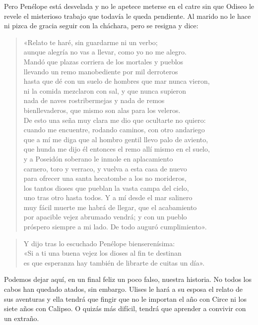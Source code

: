 Pero Penélope está desvelada y no le apetece meterse en el catre sin que Odiseo le revele el misterioso trabajo que todavía le queda pendiente. Al marido no le hace ni pizca de gracia seguir con la cháchara, pero se resigna y dice:

\begin{verse}
«Relato te haré, sin guardarme ni un verbo;\\
aunque alegría no vas a llevar, como yo no me alegro.\\
Mandó que plazas corriera de los mortales y pueblos\\
llevando un remo manobediente por mil derroteros\\
hasta que dé con un suelo de hombres que mar nunca vieron,\\
ni la comida mezclaron con sal, y que nunca supieron\\
nada de naves rostribermejas y nada de remos\\
bienllevaderos, que mismo son alas para los veleros.\\
De esto una seña muy clara me dio que ocultarte no quiero:\\
cuando me encuentre, rodando caminos, con otro andariego\\
que a mí me diga que al hombro gentil llevo palo de aviento,\\
que hunda me dijo él entonces el remo allí mismo en el suelo,\\
y a Poseidón soberano le inmole en aplacamiento\\
carnero, toro y verraco, y vuelva a esta casa de nuevo\\
para ofrecer una santa hecatombe a los no morideros,\\
los tantos dioses que pueblan la vasta campa del cielo,\\
uno tras otro hasta todos. Y a mí desde el mar salinero\\
muy fácil muerte me habrá de llegar, que el acabamiento\\
por apacible vejez abrumado vendrá; y con un pueblo\\
próspero siempre a mi lado. De todo auguró cumplimiento».
\end{verse}

\begin{verse}
Y dijo tras lo escuchado Penélope bienserenísima:\\
«Si a ti una buena vejez los dioses al fin te destinan\\
es que esperanza hay también de librarte de cuitas un día».
\end{verse}

Podemos dejar aquí, en un final feliz un poco falso, nuestra historia. No todos los cabos han quedado atados, sin embargo. Ulises le hará a su esposa el relato de sus aventuras y ella tendrá que fingir que no le importan el año con Circe ni los siete años con Calipso. O quizás más difícil, tendrá que aprender a convivir con un extraño.
